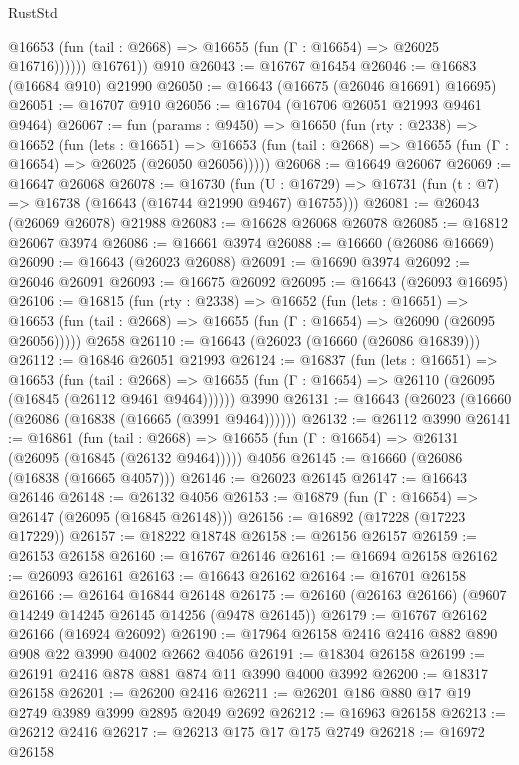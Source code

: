 \begin{lexlean}{RustStd}
\begin{coremodule}
              @16653 (fun (tail : @2668) => @16655 (fun (Γ : @16654) => @26025 @16716))))))
        @16761))
    @910
@26043 := @16767 @16454
@26046 := @16683 (@16684 @910) @21990
@26050 := @16643 (@16675 (@26046 @16691) @16695)
@26051 := @16707 @910
@26056 := @16704 (@16706 @26051 @21993 @9461 @9464)
@26067 := fun (params : @9450) =>
  @16650
    (fun (rty : @2338) =>
    @16652
      (fun (lets : @16651) =>
      @16653 (fun (tail : @2668) => @16655 (fun (Γ : @16654) => @26025 (@26050 @26056)))))
@26068 := @16649 @26067
@26069 := @16647 @26068
@26078 := @16730
    (fun (U : @16729) => @16731 (fun (t : @7) => @16738 (@16643 (@16744 @21990 @9467) @16755)))
@26081 := @26043 (@26069 @26078) @21988
@26083 := @16628 @26068 @26078
@26085 := @16812 @26067 @3974
@26086 := @16661 @3974
@26088 := @16660 (@26086 @16669)
@26090 := @16643 (@26023 @26088)
@26091 := @16690 @3974
@26092 := @26046 @26091
@26093 := @16675 @26092
@26095 := @16643 (@26093 @16695)
@26106 := @16815
    (fun (rty : @2338) =>
    @16652
      (fun (lets : @16651) =>
      @16653 (fun (tail : @2668) => @16655 (fun (Γ : @16654) => @26090 (@26095 @26056)))))
    @2658
@26110 := @16643 (@26023 (@16660 (@26086 @16839)))
@26112 := @16846 @26051 @21993
@26124 := @16837
    (fun (lets : @16651) =>
    @16653
      (fun (tail : @2668) =>
      @16655 (fun (Γ : @16654) => @26110 (@26095 (@16845 (@26112 @9461 @9464))))))
    @3990
@26131 := @16643 (@26023 (@16660 (@26086 (@16838 (@16665 (@3991 @9464))))))
@26132 := @26112 @3990
@26141 := @16861
    (fun (tail : @2668) => @16655 (fun (Γ : @16654) => @26131 (@26095 (@16845 (@26132 @9464)))))
    @4056
@26145 := @16660 (@26086 (@16838 (@16665 @4057)))
@26146 := @26023 @26145
@26147 := @16643 @26146
@26148 := @26132 @4056
@26153 := @16879 (fun (Γ : @16654) => @26147 (@26095 (@16845 @26148)))
@26156 := @16892 (@17228 (@17223 @17229))
@26157 := @18222 @18748
@26158 := @26156 @26157
@26159 := @26153 @26158
@26160 := @16767 @26146
@26161 := @16694 @26158
@26162 := @26093 @26161
@26163 := @16643 @26162
@26164 := @16701 @26158
@26166 := @26164 @16844 @26148
@26175 := @26160 (@26163 @26166) (@9607 @14249 @14245 @26145 @14256 (@9478 @26145))
@26179 := @16767 @26162 @26166 (@16924 @26092)
@26190 := @17964 @26158 @2416 @2416 @882 @890 @908 @22 @3990 @4002 @2662 @4056
@26191 := @18304 @26158
@26199 := @26191 @2416 @878 @881 @874 @11 @3990 @4000 @3992
@26200 := @18317 @26158
@26201 := @26200 @2416
@26211 := @26201 @186 @880 @17 @19 @2749 @3989 @3999 @2895 @2049 @2692
@26212 := @16963 @26158
@26213 := @26212 @2416
@26217 := @26213 @175 @17 @175 @2749
@26218 := @16972 @26158

\end{coremodule}
\end{lexlean}
